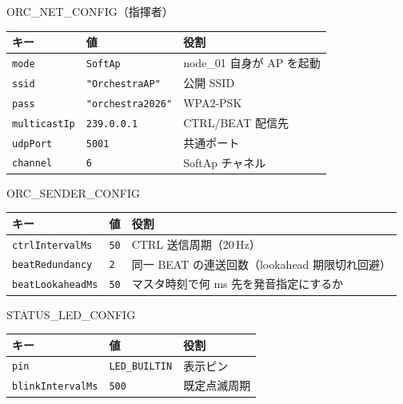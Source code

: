 \documentclass[lualatex,book,paper=a4paper,jafontsize=11.5pt,jafontscale=1.05]{jlreq}
\begin{document}
\begin{apibox}{ORC\_NET\_CONFIG（指揮者）}
\begin{tabular}{l l p{}}
\toprule
\textbf{キー} & \textbf{値} & \textbf{役割} \\
\midrule
\texttt{mode}        & \texttt{SoftAp}             & node\_01 自身が AP を起動 \\
\texttt{ssid}        & \texttt{"OrchestraAP"}      & 公開 SSID \\
\texttt{pass}        & \texttt{"orchestra2026"}    & WPA2-PSK \\
\texttt{multicastIp} & \texttt{239.0.0.1}          & CTRL/BEAT 配信先 \\
\texttt{udpPort}     & \texttt{5001}               & 共通ポート \\
\texttt{channel}     & \texttt{6}                  & SoftAp チャネル \\
\bottomrule
\end{tabular}
\end{apibox}

\begin{apibox}{ORC\_SENDER\_CONFIG}
\begin{tabular}{l l p{}}
\toprule
\textbf{キー} & \textbf{値} & \textbf{役割} \\
\midrule
\texttt{ctrlIntervalMs}  & \texttt{50}  & CTRL 送信周期（20\,Hz） \\
\texttt{beatRedundancy}  & \texttt{2}   & 同一 BEAT の連送回数（lookahead 期限切れ回避） \\
\texttt{beatLookaheadMs} & \texttt{50}  & マスタ時刻で何 ms 先を発音指定にするか \\
\bottomrule
\end{tabular}
\end{apibox}

\begin{apibox}{STATUS\_LED\_CONFIG}
\begin{tabular}{l l p{}}
\toprule
\textbf{キー} & \textbf{値} & \textbf{役割} \\
\midrule
\texttt{pin}             & \texttt{LED\_BUILTIN} & 表示ピン \\
\texttt{blinkIntervalMs} & \texttt{500}          & 既定点滅周期 \\
\bottomrule
\end{tabular}
\end{apibox}
\end{document}
